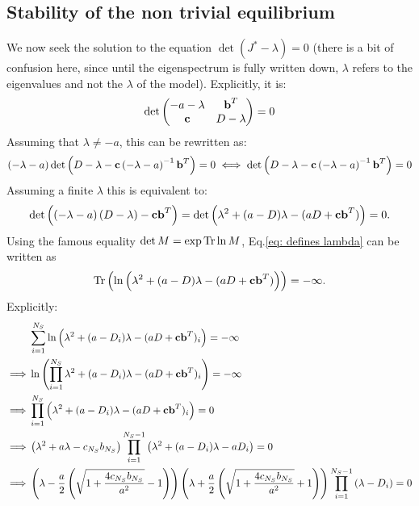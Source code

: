 \documentclass[12pt, titlepage]{report}
\begin{document}
		\subsection{Stability of the non trivial equilibrium}
	We now seek the solution to the equation $\det(J^*-\lambda)=0$ (there is a bit of confusion here, since until the eigenspectrum is fully written down, $\lambda$ refers to the eigenvalues and not the $\lambda$ of the model). Explicitly, it is:
	\begin{equation}
		\det
		\begin{pmatrix}
			-a-\lambda & \textbf{b}^T \\
			\textbf{c} & D-\lambda
		\end{pmatrix}
		=0 \label{eq : block matrix equilibrium one resource}
	\end{equation}
	Assuming that $\lambda \neq -a$, this can be rewritten as:
	\begin{equation}
		\left(-\lambda-a\right)\det\left(D-\lambda-\textbf{c}\left(-\lambda-a\right)^{-1}\textbf{b}^T\right) = 0 \iff \det\left(D-\lambda-\textbf{c}\left(-\lambda-a\right)^{-1}\textbf{b}^T\right) =0
	\end{equation}
	Assuming a finite $\lambda$ this is equivalent to:
	\begin{equation}
		\det\left(\left(-\lambda-a\right)\left(D-\lambda\right)-\textbf{c}\textbf{b}^T\right) = \det\left(\lambda^2+(a-D)\lambda-(aD+\textbf{c}\textbf{b}^T)\right)=0.
		\label{eq: defines lambda}
	\end{equation}
	Using the famous equality $\det M=\exp\operatorname{Tr}\ln M$, Eq.\eqref{eq: defines lambda}
	can be written as
	\begin{equation}
		\operatorname{Tr}\left(\ln\left(\lambda^2+(a-D)\lambda-(aD+\textbf{c}\textbf{b}^T)\right)\right)=-\infty.
	\end{equation}
	Explicitly:
	\begin{align}
		& \sum_{i=1}^{N_S} \ln\left(\lambda^2+(a-D_i) \lambda - (aD+\textbf{c}\textbf{b}^T)_i\right) = -\infty \\
		\implies& \ln\left(\prod_{i=1}^{N_S} \lambda^2+(a-D_i) \lambda - (aD+\textbf{c}\textbf{b}^T)_i\right) = -\infty \\
		\implies& \prod_{i=1}^{N_S} \left(\lambda^2+(a-D_i) \lambda - (aD+\textbf{c}\textbf{b}^T)_i\right) =0 \\
		\implies& \left(\lambda^2+a\lambda-c_{N_S}b_{N_S}\right)\prod_{i=1}^{N_S-1} \left(\lambda^2+(a-D_i) \lambda - aD_i\right)  =0 \\
		\implies& \left(\lambda-\frac{a}{2}\left(\sqrt{1+\frac{4 c_{N_S} b_{N_S}}{a^2}}-1\right)\right)\left(\lambda+\frac{a}{2}\left(\sqrt{1+\frac{4 c_{N_S} b_{N_S}}{a^2}}+1\right)\right)
			\prod_{i=1}^{N_S-1}\left(\lambda-D_i\right) =0
	\end{align}
\end{document}
